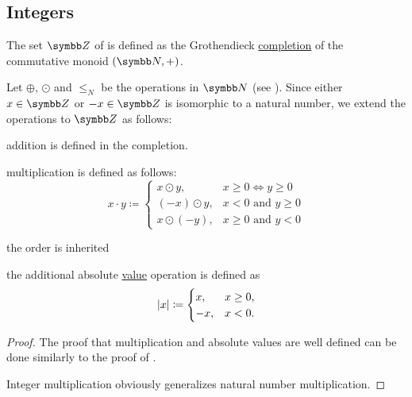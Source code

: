 \subsection{Integers}\label{subsec:integers}

\begin{definition}\label{def:integers}
  The set \( \BZ \) of  is defined as the Grothendieck \hyperref[thm:monoid_completion_to_abelian_group]{completion} of the commutative monoid \( (\BN, +) \).

  Let \( \oplus \), \( \odot \) and \( \leq_N \) be the operations in \( \BN \) (see ). Since either \( x \in \BZ \) or \( -x \in \BZ \) is isomorphic to a natural number, we extend the operations to \( \BZ \) as follows:
  \begin{DefEnum}
    \item addition is defined in the completion.
    \item multiplication is defined as follows:
          \begin{equation*}
            x \cdot y \coloneqq \begin{cases}
              x \odot y,    & x \geq 0 \iff y \geq 0      \\
              (-x) \odot y, & x < 0 \text{ and } y \geq 0 \\
              x \odot (-y), & x \geq 0 \text{ and } y < 0
            \end{cases}
          \end{equation*}

     the order is inherited
    \item the additional absolute \hyperref[def:absolute_value]{value} operation is defined as
          \begin{equation*}
            \left\vert x \right\vert \coloneqq \begin{cases}
              x,  & x \geq 0, \\
              -x, & x < 0.
            \end{cases}
          \end{equation*}
  \end{DefEnum}
\end{definition}
\begin{proof}
  The proof that multiplication and absolute values are well defined can be done similarly to the proof of .

  Integer multiplication obviously generalizes natural number multiplication.
\end{proof}

